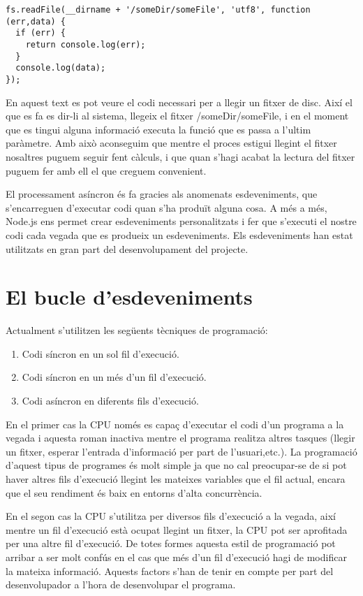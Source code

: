 \begin{lstlisting}
fs.readFile(__dirname + '/someDir/someFile', 'utf8', function (err,data) {
  if (err) {
    return console.log(err);
  }
  console.log(data);
});
\end{lstlisting}

En aquest text es pot veure el codi necessari per a llegir un fitxer de disc. Així el que es fa es dir-li al sistema, llegeix el fitxer /someDir/someFile, i en el moment que es tingui alguna informació executa la funció que es passa a l'ultim paràmetre. Amb això aconseguim que mentre el proces estigui llegint el fitxer nosaltres puguem seguir fent càlculs, i que quan s'hagi acabat la lectura del fitxer puguem fer amb ell el que creguem convenient. 

El processament asíncron és fa gracies als anomenats esdeveniments, que s'encarreguen d'executar codi quan s'ha produït alguna cosa. A més a més, Node.js ens permet crear esdeveniments personalitzats i fer que s'executi el nostre codi cada vegada que es produeix un esdeveniments. Els esdeveniments han estat utilitzats en gran part del desenvolupament del projecte. 

\section{El bucle d'esdeveniments}

Actualment s'utilitzen les següents tècniques de programació: 

\begin{enumerate}
    \item{Codi síncron en un sol fil d'execució.}
    \item{Codi síncron en un més d'un fil d'execució.}
    \item{Codi asíncron en diferents fils d'execució.}
\end{enumerate}

En el primer cas la CPU només es capaç d'executar el codi d'un programa a la vegada i aquesta roman inactiva mentre el programa realitza altres tasques (llegir un fitxer, esperar l'entrada d'informació per part de l'usuari,etc.). La programació d'aquest tipus de programes és molt simple ja que no cal preocupar-se de si pot haver altres fils d'execució llegint les mateixes variables que el fil actual, encara que el seu rendiment és baix en entorns d'alta concurrència. 

En el segon cas la CPU s'utilitza per diversos fils d'execució a la vegada, així mentre un fil d'execució està ocupat llegint un fitxer, la CPU pot ser aprofitada per una altre fil d'execució. De totes formes aquesta estil de programació pot arribar a ser molt confús en el cas que més d'un fil d'execució hagi de modificar la mateixa informació. Aquests factors s'han de tenir en compte per part del desenvolupador a l'hora de desenvolupar el programa. 

